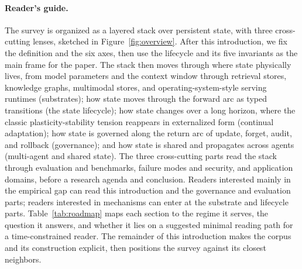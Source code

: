 \figoverview

\paragraph{Reader's guide.} The survey is organized as a layered stack over persistent state, with three cross-cutting lenses, sketched in Figure~\ref{fig:overview}. After this introduction, we fix the definition and the six axes, then use the lifecycle and its five invariants as the main frame for the paper. The stack then moves through where state physically lives, from model parameters and the context window through retrieval stores, knowledge graphs, multimodal stores, and operating-system-style serving runtimes (substrates); how state moves through the forward arc as typed transitions (the state lifecycle); how state changes over a long horizon, where the classic plasticity-stability tension reappears in externalized form (continual adaptation); how state is governed along the return arc of update, forget, audit, and rollback (governance); and how state is shared and propagates across agents (multi-agent and shared state). The three cross-cutting parts read the stack through evaluation and benchmarks, failure modes and security, and application domains, before a research agenda and conclusion. Readers interested mainly in the empirical gap can read this introduction and the governance and evaluation parts; readers interested in mechanisms can enter at the substrate and lifecycle parts. Table~\ref{tab:roadmap} maps each section to the regime it serves, the question it answers, and whether it lies on a suggested minimal reading path for a time-constrained reader. The remainder of this introduction makes the corpus and its construction explicit, then positions the survey against its closest neighbors.

